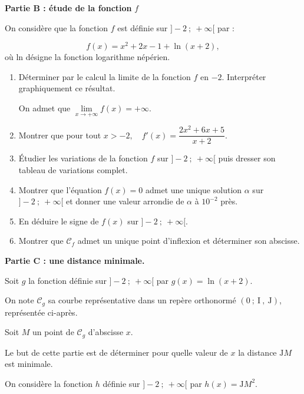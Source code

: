 \documentclass[10pt]{article}
\begin{document}
\medskip

\textbf{Partie B : étude de la fonction }\boldmath $f$ \unboldmath

\medskip

On considère que la fonction $f$ est définie sur $]-2 ~;~+\infty[$ par :

\[f(x) = x^{2}+ 2x - 1 + \ln (x + 2),\]
 où ln désigne la fonction logarithme népérien.

\begin{enumerate}
\item Déterminer par le calcul la limite de la fonction $f$ en $-2$. Interpréter graphiquement ce résultat.

On admet que $\lim\limits_{x  \to +\infty} f(x)=+\infty$.

\item Montrer que pour tout $x>-2, \quad f'(x)=\dfrac{2 x^{2}+6 x+5}{x+2}$.

\item Étudier les variations de la fonction $f$ sur $]-2 ~;~+\infty[$ puis dresser son tableau de variations complet.

\item Montrer que l'équation $f(x)=0$ admet une unique solution $\alpha$ sur $]-2 ~;~+\infty[$ et donner une valeur arrondie de $\alpha$ à $10^{-2}$ près.

\item En déduire le signe de $f(x)$ sur $]-2~;~ +\infty[$.

\item Montrer que $\mathcal{C}_{f}$ admet un unique point d'inflexion et déterminer son abscisse.

\end{enumerate}

\medskip

\textbf{Partie C : une distance minimale.}

\medskip
Soit $g$ la fonction définie sur $]-2 ~;~ +\infty[$ par \quad $g(x)=\ln (x+2)$.

On note $\mathcal{C}_{g}$ sa courbe représentative dans un repère orthonormé $(\mathrm{0} ~;~  \mathrm{I}~,~ \mathrm{J})$, représentée ci-après.

Soit $M$ un point de $\mathcal{C}_{g}$ d'abscisse $x$.

Le but de cette partie est de déterminer pour quelle valeur de $x$ la distance $\mathrm{J}M$ est minimale.

On considère la fonction $h$ définie sur $]-2 ~;~ +\infty[$ par \quad $h(x)=\mathrm{J}M^{2}$.
\end{document}

